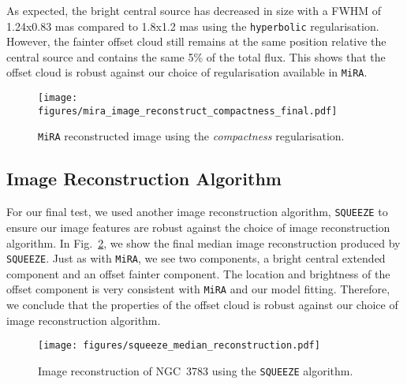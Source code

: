 \documentclass[longauth,]{aa}
\begin{document}
As expected, the bright central source has decreased in size with a FWHM of 1.24x0.83 mas compared to 1.8x1.2 mas using the \texttt{hyperbolic} regularisation. However, the fainter offset cloud still remains at the same position relative the central source and contains the same 5\% of the total flux. This shows that the offset cloud is robust against our choice of regularisation available in \texttt{MiRA}.

\begin{figure}
    \centering
    \texttt{[image: figures/mira\_image\_reconstruct\_compactness\_final.pdf]}
    \caption{\texttt{MiRA} reconstructed image using the \textit{compactness} regularisation.}
    \label{fig:compactness_image}
\end{figure}

\subsection{Image Reconstruction Algorithm}
For our final test, we used another image reconstruction algorithm, \texttt{SQUEEZE} \citep{Baron:2010aa} to ensure our image features are robust against the choice of image reconstruction algorithm. In Fig.~\ref{fig:squeeze_image}, we show the final median image reconstruction produced by \texttt{SQUEEZE}. Just as with \texttt{MiRA}, we see two components, a bright central extended component and an offset fainter component. The location and brightness of the offset component is very consistent with \texttt{MiRA} and our model fitting. Therefore, we conclude that the properties of the offset cloud is robust against our choice of image reconstruction algorithm.

\begin{figure}
    \centering
    \texttt{[image: figures/squeeze\_median\_reconstruction.pdf]}
    \caption{Image reconstruction of NGC~3783 using the \texttt{SQUEEZE} algorithm.}
    \label{fig:squeeze_image}
\end{figure}
\end{document}

